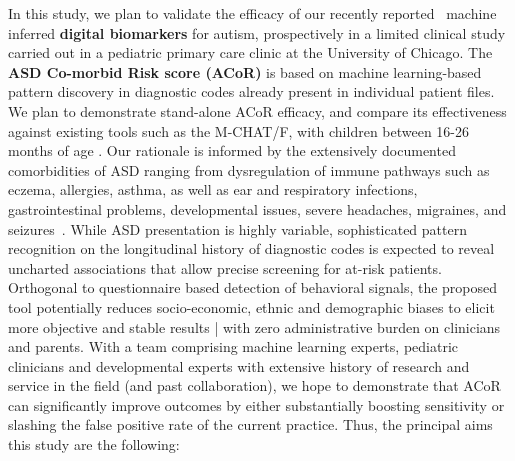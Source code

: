 \documentclass[onecolumn, compsoc,11pt]{IEEEtran}
\def\ZERO{ACoR\xspace}
\def\acor{ACoR\xspace}
\begin{document}
In this study, we plan to validate the efficacy of our recently reported~\cite{Onishchenko_2021}  machine inferred \textbf{digital biomarkers} for autism, prospectively in a limited clinical study carried out in a
pediatric primary care clinic at the University of Chicago. The \textbf{ ASD Co-morbid Risk score (\acor)} is based on machine learning-based pattern discovery in diagnostic codes already present in individual patient files. We plan to demonstrate stand-alone \acor efficacy, 
%
%
and compare its effectiveness against existing  tools such as the M-CHAT/F, with children between 16-26 months of age . Our rationale is informed by the extensively documented comorbidities of ASD ranging from dysregulation of immune pathways such as eczema, allergies, asthma, as well as ear and respiratory infections, gastrointestinal problems, developmental issues, severe headaches, migraines, and seizures~\cite{pmid30733689,pmid22511918}. While ASD presentation is highly variable, sophisticated pattern recognition on the longitudinal history of  diagnostic codes is expected to reveal uncharted associations that allow precise screening for at-risk patients.
Orthogonal to  questionnaire based  detection of behavioral signals, the proposed tool potentially reduces socio-economic, ethnic and demographic biases to elicit more  objective and stable results |  with zero  administrative burden on clinicians and parents. With a team comprising machine learning experts, pediatric clinicians and developmental experts with extensive history of research and service in the field (and past collaboration), we hope to demonstrate that \acor can  significantly improve outcomes by either substantially boosting sensitivity  or slashing the false positive rate of the current practice.
%
Thus, the principal aims  this study are the following:
     
\end{document}
